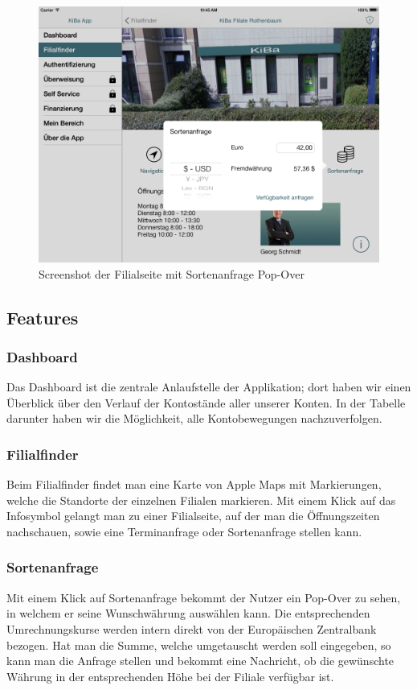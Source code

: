 \vspace{-12pt}
\begin{figure}[h!]
	\centering
	\includegraphics[height=0.25\textheight]{Pictures/Sortenanfrage}
	\vspace{-12pt}
	\caption{Screenshot der Filialseite mit Sortenanfrage Pop-Over}
	\label{fig3}
\end{figure}

\pagebreak
\subsection{Features}
\subsubsection{Dashboard}
Das Dashboard ist die zentrale Anlaufstelle der Applikation; dort haben wir einen Überblick über den Verlauf der Kontostände aller unserer Konten. In der Tabelle darunter haben wir die Möglichkeit, alle Kontobewegungen nachzuverfolgen.

\subsubsection{Filialfinder}
	Beim Filialfinder findet man eine Karte von Apple Maps mit Markierungen, welche die Standorte der einzelnen Filialen markieren. Mit einem Klick auf das Infosymbol gelangt man zu einer Filialseite, auf der man die Öffnungszeiten nachschauen, sowie eine Terminanfrage oder Sortenanfrage stellen kann.

\subsubsection{Sortenanfrage}
	Mit einem Klick auf Sortenanfrage bekommt der Nutzer ein Pop-Over zu sehen, in welchem er seine Wunschwährung auswählen kann. Die entsprechenden Umrechnungskurse werden intern direkt von der Europäischen Zentralbank bezogen. Hat man die Summe, welche umgetauscht werden soll eingegeben, so kann man die Anfrage stellen und bekommt eine Nachricht, ob die gewünschte Währung in der entsprechenden Höhe bei der Filiale verfügbar ist.

